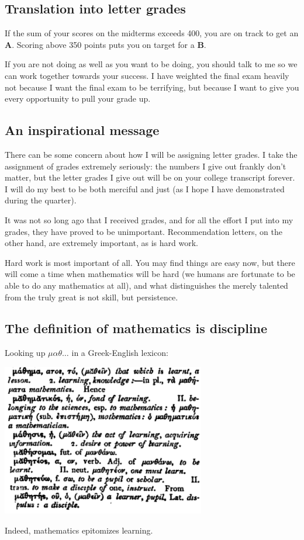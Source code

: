 \documentclass[12pt]{article}
\begin{document}
\subsection*{Translation into letter grades}

If the sum of your scores on the midterms exceeds 400, you are on
track to get an \textbf{A}.  Scoring above 350 points puts you on
target for a \textbf{B}.

If you are not doing as well as you want to be doing, you should talk
to me so we can work together towards your success. I have weighted
the final exam heavily not because I want the final exam to be
terrifying, but because I want to give you every opportunity to pull
your grade up.

\pagebreak

\subsection*{An inspirational message}

There can be some concern about how I will be assigning letter grades.
I take the assignment of grades extremely seriously: the numbers I
give out frankly don't matter, but the letter grades I give out will
be on your college transcript forever.  I will do my best to be both
merciful and just (as I hope I have demonstrated during the quarter).

It was not so long ago that I received grades, and for all the effort
I put into my grades, they have proved to be unimportant.
Recommendation letters, on the other hand, are extremely important, as
is hard work.

Hard work is most important of all. You may find things are easy now,
but there will come a time when mathematics will be hard (we humans
are fortunate to be able to do any mathematics at all), and what
distinguishes the merely talented from the truly great is not skill,
but persistence.

\subsection*{The definition of mathematics is discipline}

Looking up $\mu \alpha \theta\ldots$ in a Greek-English lexicon:
\begin{center}
\includegraphics[width=3.5in]{math-definition.png}
\end{center}
Indeed, mathematics epitomizes learning.
\end{document}
